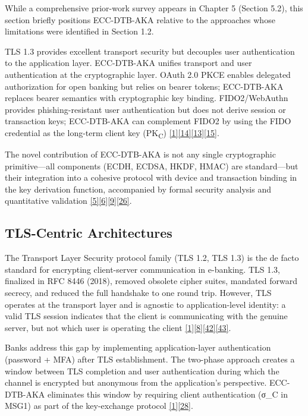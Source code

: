 \indent While a comprehensive prior-work survey appears in Chapter 5 (Section 5.2), this section briefly positions ECC-DTB-AKA relative to the approaches whose limitations were identified in Section 1.2.

\indent TLS 1.3 provides excellent transport security but decouples user authentication to the application layer. ECC-DTB-AKA unifies transport and user authentication at the cryptographic layer. OAuth 2.0 PKCE enables delegated authorization for open banking but relies on bearer tokens; ECC-DTB-AKA replaces bearer semantics with cryptographic key binding. FIDO2/WebAuthn provides phishing-resistant user authentication but does not derive session or transaction keys; ECC-DTB-AKA can complement FIDO2 by using the FIDO credential as the long-term client key (PK\textsubscript{C}) \hyperref[ref:1]{[1]}\hyperref[ref:14]{[14]}\hyperref[ref:13]{[13]}\hyperref[ref:15]{[15]}.

\indent The novel contribution of ECC-DTB-AKA is not any single cryptographic primitive---all components (ECDH, ECDSA, HKDF, HMAC) are standard---but their integration into a cohesive protocol with device and transaction binding in the key derivation function, accompanied by formal security analysis and quantitative validation \hyperref[ref:5]{[5]}\hyperref[ref:6]{[6]}\hyperref[ref:9]{[9]}\hyperref[ref:26]{[26]}.

\subsection{TLS-Centric Architectures}

\indent The Transport Layer Security protocol family (TLS 1.2, TLS 1.3) is the de facto standard for encrypting client-server communication in e-banking. TLS 1.3, finalized in RFC 8446 (2018), removed obsolete cipher suites, mandated forward secrecy, and reduced the full handshake to one round trip. However, TLS operates at the transport layer and is agnostic to application-level identity: a valid TLS session indicates that the client is communicating with the genuine server, but not which user is operating the client \hyperref[ref:1]{[1]}\hyperref[ref:8]{[8]}\hyperref[ref:42]{[42]}\hyperref[ref:43]{[43]}.

\indent Banks address this gap by implementing application-layer authentication (password + MFA) after TLS establishment. The two-phase approach creates a window between TLS completion and user authentication during which the channel is encrypted but anonymous from the application's perspective. ECC-DTB-AKA eliminates this window by requiring client authentication (σ\_C in MSG1) as part of the key-exchange protocol \hyperref[ref:1]{[1]}\hyperref[ref:28]{[28]}.

